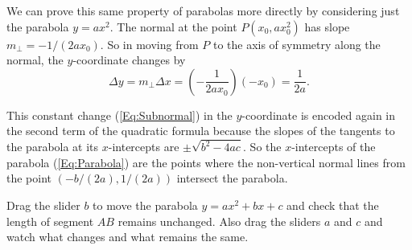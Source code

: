 \documentclass{ximera}
\begin{document}
We can prove this same property of parabolas more directly by considering just the parabola $y=ax^2$. The normal at the point $P(x_0, ax_0^2)$ has slope $m_\perp = -1/(2ax_0)$. So in moving from $P$ to the axis of symmetry along the normal, the $y$-coordinate changes by
\[
        \Delta y = m_\perp \Delta x = \left( -\frac{1}{2ax_0}\right) \left(-x_0\right)= \frac{1}{2a}   .
\]

This constant change (\ref{Eq:Subnormal}) in the $y$-coordinate is encoded again in the second term of the quadratic formula because the slopes of the tangents to the parabola at its $x$-intercepts are $\pm \sqrt{b^2-4ac}$. So the $x$-intercepts of the parabola (\ref{Eq:Parabola}) are the points where the non-vertical normal lines from the point $(-b/(2a), 1/(2a))$ intersect the parabola.


\begin{exploration}\label{exp:cq1}
Drag the slider $b$ to move the parabola $y=ax^2 +bx+c$ and check that the length of segment $AB$ remains unchanged. Also drag the sliders $a$ and $c$ and watch what changes and what remains the same.
 
 
\begin{onlineOnly}
    \begin{center}
 
\end{center}
\end{onlineOnly}
\end{exploration}



\end{document}
